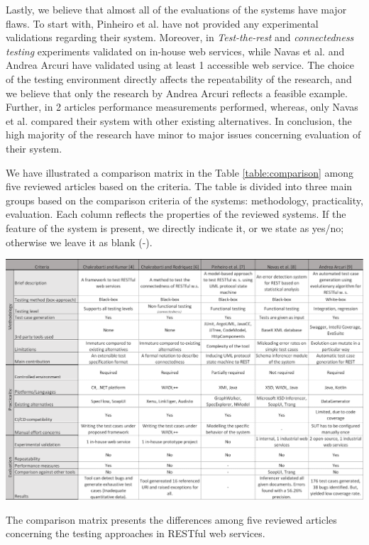 \documentclass[english]{tktltiki}
\begin{document}
Lastly, we believe that almost all of the evaluations of the systems have major flaws. To start with, Pinheiro et al. \cite{pinheiro2013model} have not provided any experimental validations regarding their system. Moreover, in \textit{Test-the-rest} and \textit{connectedness testing} \cite{chakrabarti2009test, chakrabarti2010connectedness} experiments validated on in-house web services, while Navas et al. and Andrea Arcuri \cite{navas2014rest, arcuri2017restful} have validated using at least 1 accessible web service. The choice of the testing environment directly affects the repeatability of the research, and we believe that only the research by Andrea Arcuri \cite{arcuri2017restful} reflects a feasible example. Further, in 2 articles \cite{chakrabarti2009test, arcuri2017restful} performance measurements performed, whereas, only Navas et al. \cite{navas2014rest} compared their system with other existing alternatives. In conclusion, the high majority of the research have minor to major issues concerning evaluation of their system.

We have illustrated a comparison matrix in the Table \ref{table:comparison} among five reviewed articles based on the criteria. The table is divided into three main groups based on the comparison criteria of the systems: methodology, practicality, evaluation. Each column reflects the properties of the reviewed systems. If the feature of the system is present, we directly indicate it, or we state as yes/no; otherwise we leave it as blank (-).

\begin{table}[h]
	\begin{center}
		\hspace*{-2.5cm}
		\includegraphics[width=1.25\textwidth]{images/comparison.png}
		\caption{The comparison matrix presents the differences among five reviewed articles concerning the testing approaches in RESTful web services.}
		\label{table:comparison}
	\end{center}
\end{table}
\end{document}

